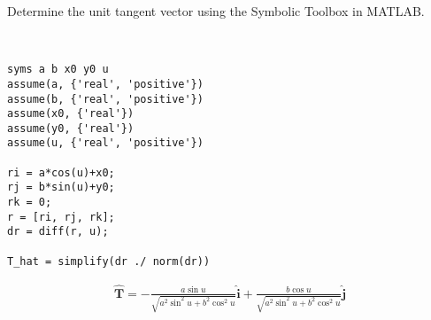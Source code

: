 Determine the unit tangent vector using the Symbolic Toolbox in MATLAB.

\begin{solution} \
\begin{lstlisting}
syms a b x0 y0 u
assume(a, {'real', 'positive'})
assume(b, {'real', 'positive'})
assume(x0, {'real'})
assume(y0, {'real'})
assume(u, {'real', 'positive'})

ri = a*cos(u)+x0;
rj = b*sin(u)+y0;
rk = 0;
r = [ri, rj, rk];
dr = diff(r, u);

T_hat = simplify(dr ./ norm(dr))
\end{lstlisting}

\begin{align*}
    \boldsymbol{\hat{T}} = -\frac{a\sin u}{\sqrt{a^2\sin^2u + b^2\cos^2u}} \hat{\boldsymbol{i}} + \frac{b\cos u}{\sqrt{a^2\sin^2u + b^2\cos^2u}} \hat{\boldsymbol{j}}
\end{align*}
\end{solution}